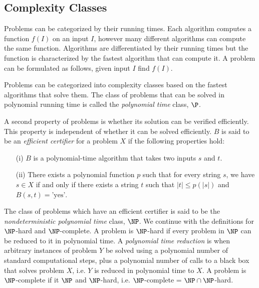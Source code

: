 \documentclass[10pt]{CSUNthesis}
\theoremstyle{plain}%
\theoremstyle{definition}
\theoremstyle{remark}
\begin{document}
\subsection{Complexity Classes}
Problems can be categorized by their running times.
Each algorithm computes a function $f(I)$ on an input $I$, however many different algorithms can compute the same function.
Algorithms are differentiated by their running times but the function is characterized by the fastest algorithm that can compute it.
A problem can be formulated as follows, given input $I$ find $f(I)$.

Problems can be categorized into complexity classes based on the fastest algorithms that solve them.
The class of problems that can be solved in polynomial running time is called the \textit{polynomial time} class, $\P$.

A second property of problems is whether its solution can be verified efficiently.  
This property is independent of whether it can be solved efficiently.  
$B$ is said to be an \textit{efficient certifier} for a problem $X$  if the following properties hold:
\begin{itemize}
\item[(i)] $B$ is a polynomial-time algorithm that takes two inputs $s$ and $t$.
\item[(ii)] There exists a polynomial function $p$ such that for every string $s$, we have $s \in X$ if and only if there exists a string $t$ such that $\vert t \vert \leq p\left( \vert s \vert \right)$ and $B(s,t) = \text{'yes'}$.
\end{itemize}

The class of problems which have an efficient certifier is said to be the \textit{nondeterministic polynomial time} class, $\NP$. 
We continue with the definitions for $\NP$-hard and $\NP$-complete.
A problem is $\NP$-hard if every problem in $\NP$ can be reduced to it in polynomial time.
A \textit{polynomial time reduction} is when arbitrary instances of problem $Y$ be solved using a polynomial number of standard computational steps, plus a polynomial number of calls to a black box that solves problem $X$, i.e. $Y$ is reduced in polynomial time to $X$.
A problem is $\NP$-complete if it $\NP$ and $\NP$-hard, i.e. $\NP$-complete = $\NP \cap \NP$-hard.


 
\end{document}
